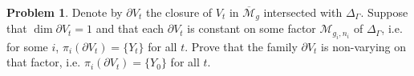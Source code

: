 \documentclass[11pt]{article}
\theoremstyle{plain}
\theoremstyle{definition}
\newtheorem{problem}[thm]{Problem}
\newcommand{\M}{\mathcal{M}}
\begin{document}
\begin{problem}
Denote by $\partial V_t$ the closure of $V_t$ in $\overline{\M} _g$ intersected with $\Delta_\Gamma$.  Suppose that $\dim \partial V_t=1$ and that each $\partial V_t$ is constant on some factor $\M_{g_i,n_i}$ of $\Delta_\Gamma$, i.e. for some $i$, $\pi_i(\partial V_t)=\{Y_t\}$ for all $t$.   Prove that the family $\partial V_t$ is non-varying on that factor, i.e. $\pi_i(\partial V_t) = \{Y_0\}$ for all $t$.   

  
\end{problem}
\end{document}
